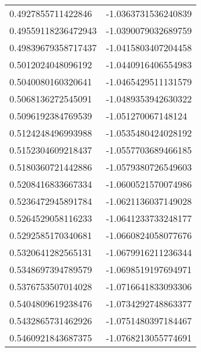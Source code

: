 \begin{supertabular}{ll}
0.4927855711422846  & -1.0363731536240839   \\
0.49559118236472943 & -1.0390079032689759   \\
0.49839679358717437 & -1.0415803407204458   \\
0.5012024048096192  & -1.0440916406554983   \\
0.5040080160320641  & -1.0465429511131579   \\
0.5068136272545091  & -1.0489353942630322   \\
0.5096192384769539  & -1.051270067148124    \\
0.5124248496993988  & -1.0535480424028192   \\
0.5152304609218437  & -1.0557703689466185   \\
0.5180360721442886  & -1.0579380726549603   \\
0.5208416833667334  & -1.0600521570074986   \\
0.5236472945891784  & -1.0621136037149028   \\
0.5264529058116233  & -1.0641233733248177   \\
0.5292585170340681  & -1.0660824058077676   \\
0.5320641282565131  & -1.0679916211236344   \\
0.5348697394789579  & -1.0698519197694971   \\
0.5376753507014028  & -1.0716641833093306   \\
0.5404809619238476  & -1.0734292748863377   \\
0.5432865731462926  & -1.0751480397184467   \\
0.5460921843687375  & -1.0768213055774691   \\
\end{supertabular}
